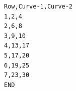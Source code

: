 \begin{verbatim}
Row,Curve-1,Curve-2
1,2,4
2,6,8
3,9,10
4,13,17
5,17,20
6,19,25
7,23,30
END
\end{verbatim}